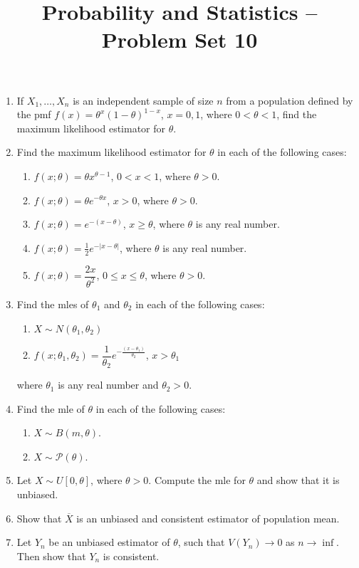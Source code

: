 \documentclass[svgnames]{amsart}
\title[]{Probability and Statistics -- Problem Set 10}
\begin{document}
\maketitle
\begin{enumerate}[leftmargin=*, itemsep=2mm]
\item If $X_1, \ldots, X_n$ is an independent sample of size $n$ from a population defined by the pmf $f(x) = \theta^x (1 - \theta)^{1 - x}$, $x = 0, 1$, where $0 < \theta < 1$, find the maximum likelihood estimator for $\theta$.

\item Find the maximum likelihood estimator for $\theta$ in each of the following cases:
\begin{enumerate}
\item $f(x; \theta) = \theta x^{\theta - 1}$, $0 < x < 1$, where $\theta > 0$.
\item $f(x; \theta) = \theta e^{-\theta x}$, $x > 0$, where $\theta > 0$.
\item $f(x; \theta) = e^{-(x - \theta)}$, $x \ge \theta$, where $\theta$ is any real number.
\item $f(x; \theta) = \frac 1 2 e^{-|x - \theta|}$, where $\theta$ is any real number.
\item $f(x; \theta) = \dfrac {2x} {\theta^2}$, $0 \le x \le \theta$, where $\theta > 0$.
\end{enumerate}

\item Find the mles of $\theta_1$ and $\theta_2$ in each of the following cases:
\begin{enumerate}
\item $X \sim N(\theta_1, \theta_2)$
\item $f(x; \theta_1, \theta_2) = \dfrac{1}{\theta_2} e^{- \frac{(x - \theta_1)}{\theta_2}}$, $x > \theta_1$
\end{enumerate}
where $\theta_1$ is any real number and $\theta_2 > 0$.

\item Find the mle of $\theta$ in each of the following cases:
\begin{enumerate}
\item  $X \sim B(m, \theta)$.
\item $X \sim \mathcal P(\theta)$.
\end{enumerate}

\item Let $X \sim U[0, \theta]$, where $\theta > 0$. Compute the mle for $\theta$ and show that it is unbiased.

\item Show that $\overline X$ is an unbiased and consistent estimator of population mean.

\item Let $Y_n$ be an unbiased estimator of $\theta$, such that $V(Y_n) \to 0$ as $n \to \inf$. Then show that $Y_n$ is consistent.

\end{enumerate}
\end{document}
